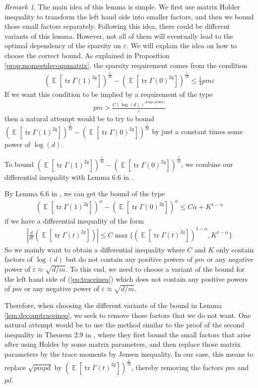 \documentclass[11pt]{amsart}
\numberwithin{equation}{section}
\numberwithin{equation}{section}
\DeclareMathOperator{\E}{\mathbb{E}}
\DeclareMathOperator*{\tr}{tr}
\theoremstyle{remark}
\newtheorem{remark}[theorem]{Remark}
\theoremstyle{definition}
\begin{document}
\begin{remark}
The main idea of this lemma is simple. We first use matrix Holder inequality to transform the left hand side into smaller factors, and then we bound those small factors separately. Following this idea, there could be different variants of this lemma. However, not all of them will eventually lead to the optimal dependency of the sparsity on $\varepsilon$. We will explain the idea on how to choose the correct bound. As explained in Proposition \ref{prop:momestdecoupmatrix}, the sparsity requirement comes from the condition
\begin{align*}
    (\E[\tr \Gamma(1)^{2q}])^{\frac{1}{2q}}-(\E[\tr \Gamma(0)^{2q}])^{\frac{1}{2q}} \le \frac{1}{4} pm \varepsilon
\end{align*}
If we want this condition to be implied by a requirement of the type
\begin{align*}
    pm>\frac{C (\log(d))^{\text{(some power)}}}{\varepsilon}
\end{align*}
then a natural attempt would be to try to bound $(\E[\tr \Gamma(1)^{2q}])^{\frac{1}{2q}}-(\E[\tr \Gamma(0)^{2q}])^{\frac{1}{2q}}$ by just a constant times some power of $\log(d)$.

To bound $(\E[\tr \Gamma(1)^{2q}])^{\frac{1}{2q}}-(\E[\tr \Gamma(0)^{2q}])^{\frac{1}{2q}}$, we combine our differential inequality with Lemma 6.6 in \cite{brailovskaya2022universality}.

By Lemma 6.6 in \cite{brailovskaya2022universality}, we can get the bound of the type
\begin{align*}
    (\E[\tr \Gamma(1)^{2q}])^{\alpha}-(\E[\tr \Gamma(0)^{2q}])^{\alpha} \le C\alpha +K^{1-\alpha}
\end{align*}
if we have a differential inequality of the form
\begin{align*}
    |\frac{d}{dt}(\E[\tr \Gamma(t)^{2q}])| \le C \max\{(\E[\tr \Gamma(t)^{2q}])^{1-\alpha},K^{1-\alpha}\}
\end{align*}
So we mainly want to obtain a differential inequality where $C$ and $K$ only contain factors of $\log(d)$ but do not contain any positive powers of $pm$ or any negative power of $\varepsilon \approx \sqrt{d/m}$. To this end, we need to choose a variant of the bound for the left hand side of (\ref{eq:traceineq}) which does not contain any positive powers of $pm$ or any negative power of $\varepsilon \approx \sqrt{d/m}$.

Therefore, when choosing the different variants of the bound in Lemma \ref{lem:decouptraceineq}, we seek to remove those factors that we do not want. One natural attempt would be to use the method similar to the proof of the second inequality in Theorem 2.9 in \cite{brailovskaya2022universality}, where they first bound the small factors that arise after using Holder by some matrix parameters, and then replace those matrix parameters by the trace moments by Jensen inequality. In our case, this means to replace $\sqrt{pmpd}$ by $(\E[\tr \Gamma(t)^{2q}])^{\frac{1}{2q}}$, thereby removing the factors $pm$ and $pd$.


\end{remark}
\end{document}

